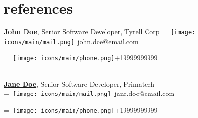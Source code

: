 \documentclass{stationery-resume}
\begin{document}
\begin{minipage}[t]{0.25\textwidth}

\section{references} 
\href{https://www.linkedin.com/company/john-doe/}{\textbf{John Doe}, Senior Software Developer, Tyrell Corp}
\begingroup
{}=\hbox{
\texttt{[image: icons/main/mail.png]}\hspace{0.3cm} john.doe@email.com
}
\parbox{\wd0}{}
\endgroup
\begingroup
{}=\hbox{
\texttt{[image: icons/main/phone.png]}\hspace{0.3cm}+19999999999
}
\parbox{\wd0}{}\endgroup
\\
\sectionsep
\href{https://www.linkedin.com/company/john-doe/}{\textbf{Jane Doe}}, Senior Software Developer, Primatech 
\\
\begingroup
{}=\hbox{
\texttt{[image: icons/main/mail.png]}\hspace{0.3cm} jane.doe@email.com
}
\parbox{\wd0}{}
\endgroup
\begingroup
{}=\hbox{
\texttt{[image: icons/main/phone.png]}\hspace{0.3cm}+19999999999
}
\parbox{\wd0}{}\endgroup
\\






\end{minipage} 
\end{document}
